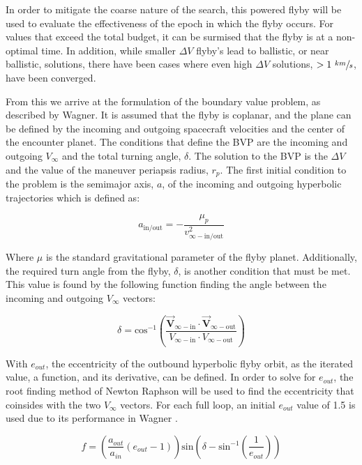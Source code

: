 \documentclass[letterpaper, preprint, paper,11pt]{AAS}	%
\begin{document}
In order to mitigate the coarse nature of the search, this powered flyby will be used to evaluate the effectiveness of the epoch in which the flyby occurs. For values that exceed the total budget, it can be surmised that the flyby is at a non-optimal time. In addition, while smaller $\Delta V$ flyby's lead to ballistic, or near ballistic, solutions, there have been cases where even high $\Delta V$ solutions, $> 1 \text{ } \sfrac{km}{s}$, have been converged.

From this we arrive at the formulation of the boundary value problem, as described by Wagner\cite{Wagner2015}. It is assumed that the flyby is coplanar, and the plane can be defined by the incoming and outgoing spacecraft velocities and the center of the encounter planet. The conditions that define the BVP are the incoming and outgoing $V_\infty$ and the total turning angle, $\delta$. The solution to the BVP is the $\Delta V$ and the value of the maneuver periapsis radius, $r_p$. The first initial condition to the problem is the semimajor axis, $a$, of the incoming and outgoing hyperbolic trajectories which is defined as:

\begin{equation}
    a_\text{in/out} = -\frac{\mu_p}{v^2_{\infty-\text{in/out}}}
\end{equation}

Where $\mu$ is the standard gravitational parameter of the flyby planet. Additionally, the required turn angle from the flyby, $\delta$, is another condition that must be met. This value is found by the following function finding the angle between the incoming and outgoing $V_\infty$ vectors:

\begin{equation}
    \delta = \text{cos}^{-1}\left(\frac{ \vec{\textbf{V}}_{\infty-\text{in}} \cdot \vec{\textbf{V}}_{\infty-\text{out}} }{ V_{\infty-\text{in}} \cdot V_{\infty-\text{out}} }\right)
\end{equation}

With $e_{out}$, the eccentricity of the outbound hyperbolic flyby orbit, as the iterated value, a function, and its derivative, can be defined. In order to solve for $e_{out}$, the root finding method of Newton Raphson will be used to find the eccentricity that coinsides with the two $V_\infty$ vectors. For each full loop, an initial $e_{out}$ value of 1.5 is used due to its performance in Wagner \cite{Wagner2015}.

\begin{equation}
    f = \left( \frac{a_{out}}{a_{in}} (e_{out} - 1) \right) \text{sin} \left( \delta - \text{sin}^{-1} \left( \frac{1}{e_{out}} \right) \right) 
\end{equation}
\end{document}
